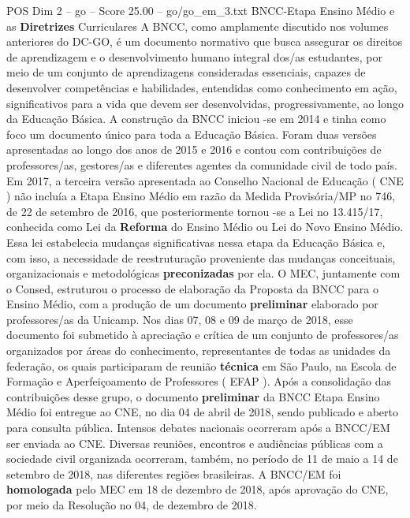 \begin{textsample}{POS Dim 2 – go – Score 25.00 – go/go\_em\_3.txt}  \label{ex:f2_pos_176}
BNCC-Etapa Ensino Médio e as \textbf{Diretrizes} Curriculares A BNCC, como amplamente discutido nos volumes anteriores do DC-GO, é um documento normativo que busca assegurar os direitos de aprendizagem e o desenvolvimento humano integral dos/as estudantes, por meio de um conjunto de aprendizagens consideradas essenciais, capazes de desenvolver competências e habilidades, entendidas como conhecimento em ação, significativos para a vida que devem ser desenvolvidas, progressivamente, ao longo da Educação Básica.
A construção da BNCC iniciou -se em 2014 e tinha como foco um documento único para toda a Educação Básica.
Foram duas versões apresentadas ao longo dos anos de 2015 e 2016 e contou com contribuições de professores/as, gestores/as e diferentes agentes da comunidade civil de todo país.
Em 2017, a terceira versão apresentada ao Conselho Nacional de Educação ( CNE ) não incluía a Etapa Ensino Médio em razão da Medida Provisória/MP no 746, de 22 de setembro de 2016, que posteriormente tornou -se a Lei no 13.415/17, conhecida como Lei da \textbf{Reforma} do Ensino Médio ou Lei do Novo Ensino Médio.
Essa lei estabelecia mudanças significativas nessa etapa da Educação Básica e, com isso, a necessidade de reestruturação proveniente das mudanças conceituais, organizacionais e metodológicas \textbf{preconizadas} por ela.
O MEC, juntamente com o Consed, estruturou o processo de elaboração da Proposta da BNCC para o Ensino Médio, com a produção de um documento \textbf{preliminar} elaborado por professores/as da Unicamp.
Nos dias 07, 08 e 09 de março de 2018, esse documento foi submetido à apreciação e crítica de um conjunto de professores/as organizados por áreas do conhecimento, representantes de todas as unidades da federação, os quais participaram de reunião \textbf{técnica} em São Paulo, na Escola de Formação e Aperfeiçoamento de Professores ( EFAP ).
Após a consolidação das contribuições desse grupo, o documento \textbf{preliminar} da BNCC Etapa Ensino Médio foi entregue ao CNE, no dia 04 de abril de 2018, sendo publicado e aberto para consulta pública.
Intensos debates nacionais ocorreram após a BNCC/EM ser enviada ao CNE.
Diversas reuniões, encontros e audiências públicas com a sociedade civil organizada ocorreram, também, no período de 11 de maio a 14 de setembro de 2018, nas diferentes regiões brasileiras.
A BNCC/EM foi \textbf{homologada} pelo MEC em 18 de dezembro de 2018, após aprovação do CNE, por meio da Resolução no 04, de dezembro de 2018.

\end{textsample}
